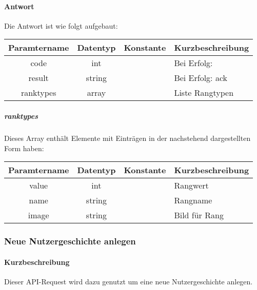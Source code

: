 \paragraph{Antwort}Die Antwort ist wie folgt aufgebaut:
\begin{table}[H]
	\begin{tabular}{|c|c|c|p{6.5cm}|}
		\hline
		\textbf{Paramtername} & \textbf{Datentyp} & \textbf{Konstante} & \textbf{Kurzbeschreibung}            \\ \hline                
		code                & int              &                 & Bei Erfolg: {\glqq 0\grqq} \\ \hline
		result              & string           &                 & Bei Erfolg: {\glqq ack\grqq} \\ \hline
		ranktypes           & array            &                 & Liste Rangtypen \\ \hline
	\end{tabular}
\end{table}
\subparagraph{ranktypes}Dieses Array enthält Elemente mit Einträgen in der nachstehend dargestellten Form haben:
\begin{table}[H]
	\begin{tabular}{|c|c|c|p{6.5cm}|}
		\hline
		\textbf{Paramtername} & \textbf{Datentyp} & \textbf{Konstante} & \textbf{Kurzbeschreibung}    \\ \hline
		value              & int               &                 & Rangwert \\ \hline
		name               & string            &                 & Rangname \\ \hline
		image              & string            &                 & Bild für Rang \\ \hline
	\end{tabular}
\end{table}
\subsubsection{Neue Nutzergeschichte anlegen}
\paragraph{Kurzbeschreibung}Dieser API-Request wird dazu genutzt um eine neue Nutzergeschichte anlegen.
